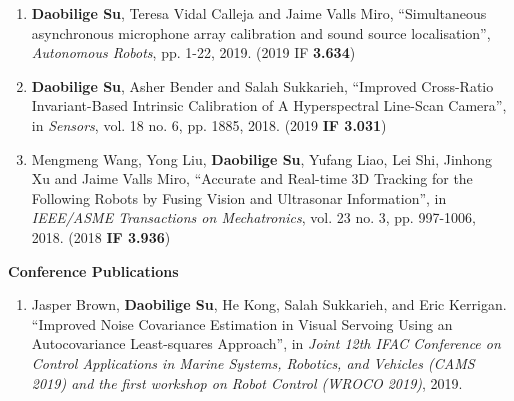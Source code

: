 \documentclass[margin,line]{res}
\begin{document}
\begin{resume}
\begin{enumerate}
\item {\bf Daobilige Su}, Teresa Vidal Calleja and Jaime Valls Miro, ``Simultaneous asynchronous microphone array calibration and sound source localisation'', {\it Autonomous Robots}, pp. 1-22, 2019. (2019 IF \textbf{3.634})


\item {\bf Daobilige Su}, Asher Bender and Salah Sukkarieh, ``Improved Cross-Ratio Invariant-Based Intrinsic Calibration of A Hyperspectral Line-Scan Camera'', in {\it Sensors}, vol. 18 no. 6, pp. 1885, 2018. (2019 \textbf{IF 3.031})

\item Mengmeng Wang, Yong Liu, {\bf Daobilige Su}, Yufang Liao, Lei Shi, Jinhong Xu and Jaime Valls Miro, ``Accurate and Real-time 3D Tracking for the Following Robots by Fusing Vision and Ultrasonar Information'', in {\it IEEE/ASME Transactions on Mechatronics}, vol. 23 no. 3, pp. 997-1006, 2018. (2018 \textbf{IF 3.936})
\end{enumerate}

\textbf{Conference Publications}
\begin{enumerate}

\item Jasper Brown, \textbf{Daobilige Su}, He Kong, Salah Sukkarieh, and Eric Kerrigan. ``Improved Noise Covariance Estimation in Visual Servoing Using an Autocovariance Least-squares Approach'', in \textit{Joint 12th IFAC Conference on Control Applications in Marine Systems, Robotics, and Vehicles (CAMS 2019) and the first workshop on Robot Control (WROCO 2019)}, 2019.


\end{enumerate}
\end{resume}
\end{document}
